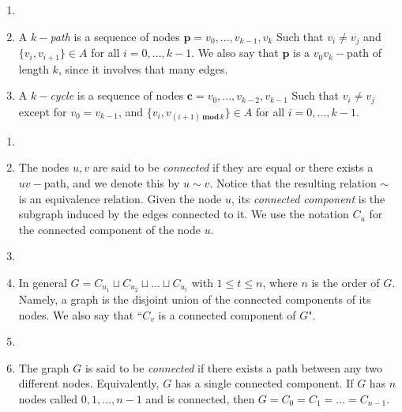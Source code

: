 \documentclass{amsart}
\begin{document}
\begin{defn}
    \begin{enumerate}
        \item[]
        \item A $k-$\emph{path} is a sequence of nodes $\mathbf{p} = v_0,...,v_{k-1},v_{k}$ Such that $v_i \neq v_j$  and $\{v_i, v_{i+1}\} \in A$ for all $i = 0,...,k-1$. We also say that $\mathbf{p}$ is a $v_0v_k-$path of length $k$, since it involves that many edges. %
        \item A $k-$\emph{cycle} is a sequence of nodes $\mathbf{c} = v_0,...,v_{k-2},v_{k-1}$ Such that $v_i \neq v_j$ except for $v_0 = v_{k-1}$, and $\{v_i, v_{(i+1) \, \mathbf{mod} \, k}\} \in A$ for all $i = 0,...,k-1$.
    \end{enumerate}
    
\end{defn}

\begin{defn}
    \begin{enumerate}
        \item[] 
        \item The nodes $u,v$ are said to be \emph{connected} if they are equal or there exists a $uv-$path, and we denote this by $u \sim v$. Notice that the resulting relation $\sim$ is an equivalence relation. Given the node $u$, its \emph{connected component} is the subgraph induced by the edges connected to it. We use the notation $C_u$ for the connected component of the node $u$.
        \item[] 
        \item In general $G = C_{u_1} \sqcup C_{u_2} \sqcup ... \sqcup C_{u_t}$ with $1 \leq t \leq n$, where $n$ is the order of $G$. Namely, a graph is the disjoint union of the connected components of its nodes. We also say that ``$C_v$ is a connected component of $G$".
        \item[] 
        \item The graph $G$ is said to be \emph{connected} if there exists a path between any two different nodes. Equivalently, $G$ has a single connected component. If $G$ has $n$ nodes called $0,1,\dots,n-1$ and is connected, then $G = C_0 = C_1 = \dots = C_{n-1}$.
    \end{enumerate}
\end{defn}
\end{document}
